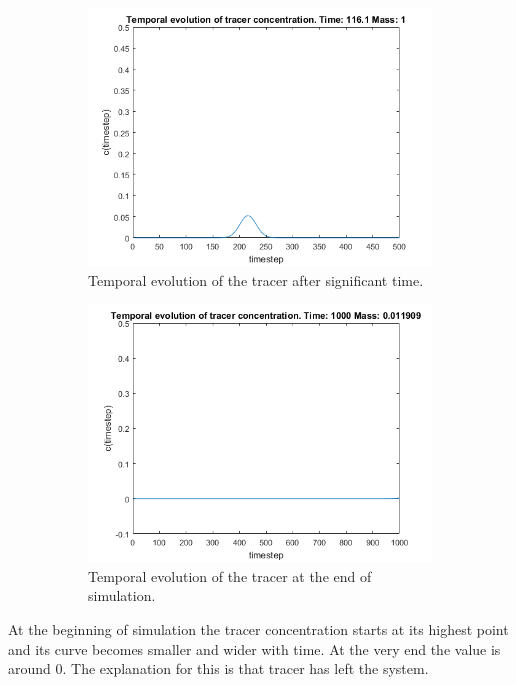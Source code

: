 \documentclass[12pt]{article}
\begin{document}
\begin{figure}[H]
	\centering
	\begin{subfigure}[b]{0.8\textwidth}   
		\centering 
		\includegraphics[width=\textwidth]{temporal3}
		{{\small Temporal evolution of the tracer after significant time.}}    
	\end{subfigure}
	\begin{subfigure}[b]{0.8\textwidth}   
		\centering 
		\includegraphics[width=\textwidth]{temporal4}
		{{\small Temporal evolution of the tracer at the end of simulation.}}    
	\end{subfigure}
\end{figure}

At the beginning of simulation the tracer concentration starts at its highest point and its curve becomes smaller and wider with time. At the very end the value is around 0. The explanation for this is that tracer has left the system. 
\end{document}

